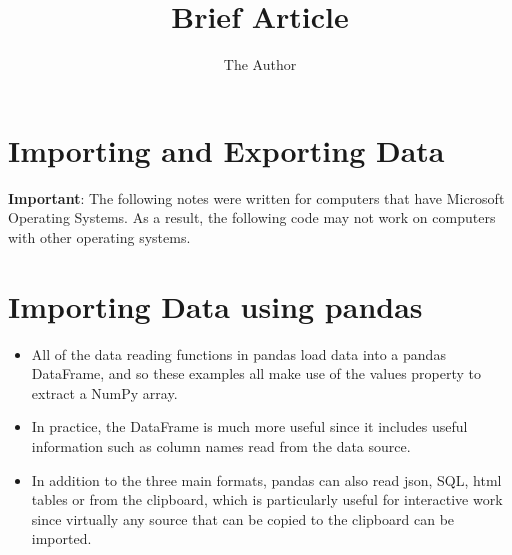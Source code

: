 \documentclass[11pt]{article} %
\title{Brief Article}
\author{The Author}
\begin{document}
	\large
	\setcounter{tocdepth}{2}
	



\section*{Importing and Exporting Data}

\begin{framed}
\noindent \textbf{Important}: The following notes were written for computers that have Microsoft Operating Systems. As a result, the following code may not work on computers with other operating systems.
\end{framed}
\section{Importing Data using pandas}


\begin{itemize}
	\item All of the data reading functions in pandas load data into a pandas
	DataFrame, and so these examples all make use of the values property to extract a
	NumPy array. 
	
	\item In practice, the DataFrame is much more useful since it includes useful information such
	as column names read from the data source. \item
	In addition to the three main formats, pandas can
	also read json, SQL, html tables or from the clipboard, which is particularly useful for interactive work
	since virtually any source that can be copied to the clipboard can be imported.
\end{itemize}
\end{document}
